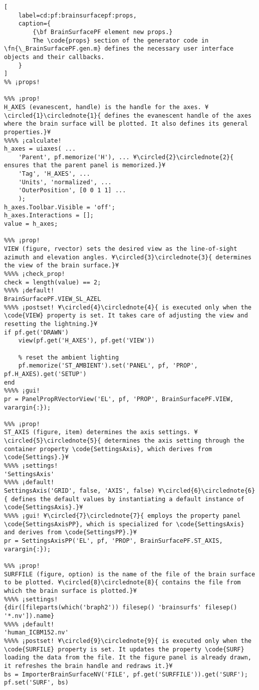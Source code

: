 \documentclass{tufte-handout}
\begin{document}
\begin{lstlisting}[
	label=cd:pf:brainsurfacepf:props,
	caption={
		{\bf BrainSurfacePF element new props.}
		The \code{props} section of the generator code in \fn{\_BrainSurfacePF.gen.m} defines the necessary user interface objects and their callbacks.
	}
]
%% ¡props!

%%% ¡prop!
H_AXES (evanescent, handle) is the handle for the axes. ¥\circled{1}\circlednote{1}{ defines the evanescent handle of the axes where the brain surface will be plotted. It also defines its general properties.}¥
%%%% ¡calculate!
h_axes = uiaxes( ...
    'Parent', pf.memorize('H'), ... ¥\circled{2}\circlednote{2}{ ensures that the parent panel is memorized.}¥
    'Tag', 'H_AXES', ...
    'Units', 'normalized', ...
    'OuterPosition', [0 0 1 1] ...
    );
h_axes.Toolbar.Visible = 'off';
h_axes.Interactions = [];
value = h_axes;

%%% ¡prop!
VIEW (figure, rvector) sets the desired view as the line-of-sight azimuth and elevation angles. ¥\circled{3}\circlednote{3}{ determines the view of the brain surface.}¥
%%%% ¡check_prop!
check = length(value) == 2;
%%%% ¡default!
BrainSurfacePF.VIEW_SL_AZEL
%%%% ¡postset! ¥\circled{4}\circlednote{4}{ is executed only when the \code{VIEW} property is set. It takes care of adjusting the view and resetting the lightning.}¥
if pf.get('DRAWN')
    view(pf.get('H_AXES'), pf.get('VIEW'))
    
    % reset the ambient lighting
    pf.memorize('ST_AMBIENT').set('PANEL', pf, 'PROP', pf.H_AXES).get('SETUP')
end
%%%% ¡gui!
pr = PanelPropRVectorView('EL', pf, 'PROP', BrainSurfacePF.VIEW, varargin{:});

%%% ¡prop!
ST_AXIS (figure, item) determines the axis settings. ¥\circled{5}\circlednote{5}{ determines the axis setting through the container property \code{SettingsAxis}, which derives from \code{Settings}.}¥
%%%% ¡settings!
'SettingsAxis'
%%%% ¡default!
SettingsAxis('GRID', false, 'AXIS', false) ¥\circled{6}\circlednote{6}{ defines the default values by instantiating a default instance of \code{SettingsAxis}.}¥
%%%% ¡gui! ¥\circled{7}\circlednote{7}{ employs the property panel \code{SettingsAxisPP}, which is specialized for \code{SettingsAxis} and derives from \code{SettingsPP}.}¥
pr = SettingsAxisPP('EL', pf, 'PROP', BrainSurfacePF.ST_AXIS, varargin{:});

%%% ¡prop!
SURFFILE (figure, option) is the name of the file of the brain surface to be plotted. ¥\circled{8}\circlednote{8}{ contains the file from which the brain surface is plotted.}¥
%%%% ¡settings!
{dir([fileparts(which('braph2')) filesep() 'brainsurfs' filesep() '*.nv']).name}
%%%% ¡default!
'human_ICBM152.nv'
%%%% ¡postset! ¥\circled{9}\circlednote{9}{ is executed only when the \code{SURFILE} property is set. It updates the property \code{SURF} loading the data from the file. It the figure panel is already drawn, it refreshes the brain handle and redraws it.}¥
bs = ImporterBrainSurfaceNV('FILE', pf.get('SURFFILE')).get('SURF');
pf.set('SURF', bs)


\end{lstlisting}
\end{document}
